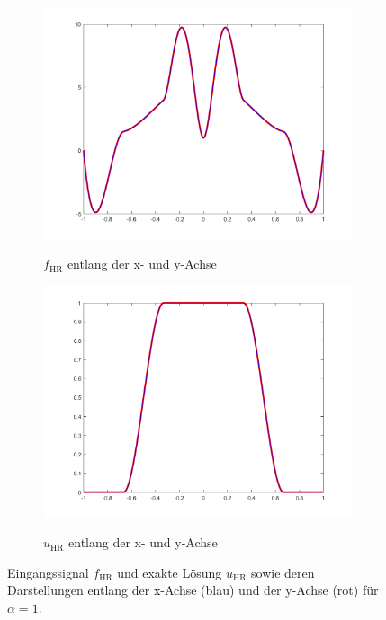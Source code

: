 \begin{figure}[p]
  \begin{subfigure}[b]{.48\linewidth}
    \centering
    \caption{$f_\textrm{HR}$ entlang der x- und y-Achse}
    \includegraphics[trim = 50 30 50 20, clip, width=\linewidth]
      {pictures/chapExperiments/secExactSol/f04/inSiAxis.png}
    \label{fig:f04InSiAxis}
  \end{subfigure}
  \quad
  \begin{subfigure}[b]{.48\linewidth}
    \centering
    \caption{$u_\textrm{HR}$ entlang der x- und y-Achse}
    \includegraphics[trim = 50 30 50 20, clip, width=\linewidth]
      {pictures/chapExperiments/secExactSol/f04/exactSolutionAxis.png}
    \label{fig:f04ExactSolAxis}
  \end{subfigure} 
  \caption{Eingangssignal $f_\textrm{HR}$ und exakte Lösung $u_\textrm{HR}$
  sowie deren Darstellungen entlang der x-Achse (blau) und der y-Achse (rot)
  für $\alpha=1$.}
  \label{fig:f04Plots}
\end{figure}
